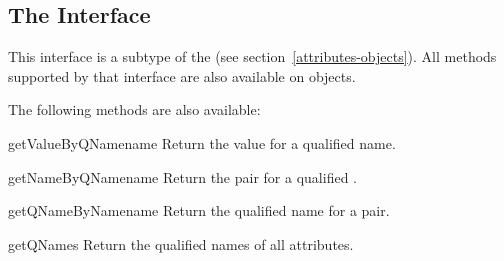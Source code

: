 

\subsection{The  Interface \label{attributes-ns-objects}}

This interface is a subtype of the  (see
section~\ref{attributes-objects}).  All methods supported by that
interface are also available on  objects.

The following methods are also available:

\begin{methoddesc}[AttributesNS]{getValueByQName}{name}
  Return the value for a qualified name.
\end{methoddesc}

\begin{methoddesc}[AttributesNS]{getNameByQName}{name}
  Return the  pair for a
  qualified .
\end{methoddesc}

\begin{methoddesc}[AttributesNS]{getQNameByName}{name}
  Return the qualified name for a  pair.
\end{methoddesc}

\begin{methoddesc}[AttributesNS]{getQNames}{}
  Return the qualified names of all attributes.
\end{methoddesc}
